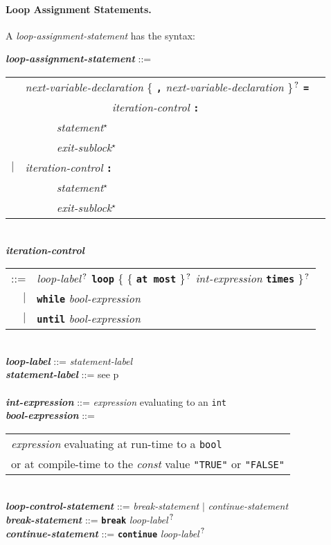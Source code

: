 \documentclass[12pt]{article}
\newcommand{\subsubsubsection}[1]{\paragraph[#1]{#1.}}
\newcommand{\TT}[1]{{\tt \bfseries #1}}
\newcommand{\STAR}{{\Large $^\star$}}
\newcommand{\QMARK}{{$^{\,\mbox{\footnotesize ?}}$}}
\newcommand{\ttkey}[1]{{\tt \bfseries #1}}
\newcommand{\emkey}[1]{{\em \bfseries #1}}
\newcommand{\pagref}[1]{p\pageref{#1}}
\newenvironment{indpar}[1][0.3in]%
	{\begin{list}{}%
		     {\setlength{\itemsep}{0in}%
		      \setlength{\topsep}{0in}%
		      \setlength{\parsep}{1ex}%
		      \setlength{\labelwidth}{#1}%
		      \setlength{\leftmargin}{#1}%
		      \addtolength{\leftmargin}{\labelsep}}%
	 \item}%
	{\end{list}}
\begin{document}
\subsubsubsection{Loop Assignment Statements}
\label{LOOP-ASSIGNMENT-STATEMENTS}

A {\em loop-assignment-statement} has the syntax:

\begin{indpar}
\emkey{loop-assignment-statement} ::= \\
\hspace*{0.5in}
    \begin{tabular}[t]{@{}rll}
        & {\em next-variable-declaration}
                \{ \TT{,} {\em next-variable-declaration} \}\QMARK{}
		\TT{=} \\
	& ~~~~~~~~~~~~~~~ {\em iteration-control} \TT{:} \\
        & ~~~~~ {\em statement}\STAR{} \\
        & ~~~~~ {\em exit-sublock}\STAR{} \\
    $|$ & {\em iteration-control} \TT{:} \\
        & ~~~~~ {\em statement}\STAR{} \\
        & ~~~~~ {\em exit-sublock}\STAR{} \\
    \end{tabular}
\\[0.5ex]
\emkey{iteration-control}\label{ITERATION-CONTROL}
    \begin{tabular}[t]{rl}
     ::= & {\em loop-label}\QMARK{} \ttkey{loop}
	   \{ \{ \ttkey{at most} \}\QMARK{}
	   {\em int-expression} \ttkey{times} \}\QMARK{} \\
     $|$ & \ttkey{while} {\em bool-expression} \\
     $|$ & \ttkey{until} {\em bool-expression} \\
     \end{tabular}
\\[0.5ex]
\emkey{loop-label} ::= {\em statement-label}
\\[0.5ex]
\emkey{statement-label} ::= see \pagref{STATEMENT-LABEL} \\
\\[0.5ex]
\emkey{int-expression} ::= {\em expression} evaluating to an {\tt int}
\\[0.5ex]
\emkey{bool-expression}\label{BOOL-EXPRESSION} ::=
    \begin{tabular}[t]{@{}l}
    {\em expression} evaluating at run-time to a {\tt bool} \\
    or at compile-time to the {\em const} value {\tt "TRUE"} or {\tt "FALSE"}
    \end{tabular}
\\[0.5ex]
\emkey{loop-control-statement}\label{LOOP-CONTROL-STATEMENT} ::=
    {\em break-statement} $|$ {\em continue-statement}
\\[0.5ex]
\emkey{break-statement}\label{BREAK-STATEMENT} ::=
    \ttkey{break} {\em loop-label}\QMARK{}
\\[0.5ex]
\emkey{continue-statement}\label{CONTINUE-STATEMENT} ::=
    \ttkey{continue} {\em loop-label}\QMARK{}
\end{indpar}
\end{document}
